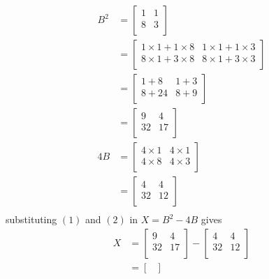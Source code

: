 \documentclass{article}
\begin{document}
\begin{align}
   B^2 & = \begin{bmatrix}
   1 & 1\\
   8 & 3\\
\end{bmatrix}
\nonumber\\
          & = \begin{bmatrix}
   1 \times 1 + 1 \times 8 & 1 \times 1 + 1 \times 3\\
   8 \times 1 + 3 \times 8 & 8 \times 1 + 3 \times 3\\
 \end{bmatrix}
 \nonumber\\
          & = \begin{bmatrix}
    1 + 8 & 1 + 3\\
    8 + 24 & 8 + 9\\
   \end{bmatrix}
   \nonumber\\
          & = \begin{bmatrix}
    9 & 4\\
    32 & 17\\
    \end{bmatrix}\\
4B & = \begin{bmatrix}
   4 \times 1 & 4 \times 1\\
   4 \times 8 & 4 \times 3\\
        \end{bmatrix}
        \nonumber\\
        & = \begin{bmatrix}
    4 & 4\\
    32 & 12\\
    \end{bmatrix}\\
    \end{align}  substituting $(1)$ and $(2)$ in $X = B^2 - 4B$ gives\begin{align}
    X & = \begin{bmatrix}
    9 & 4\\
    32 & 17\\
    \end{bmatrix}-\begin{bmatrix}
    4 & 4\\
    32 & 12\\
    \end{bmatrix}\nonumber\\
    & = \begin{bmatrix}

\end{bmatrix}
\end{align}
\end{document}
